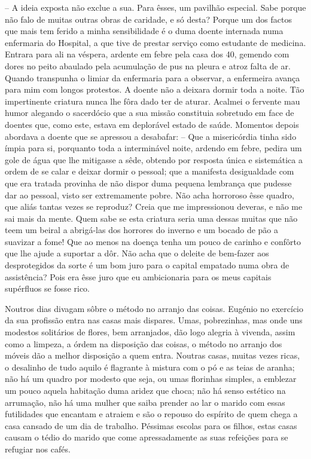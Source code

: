 \documentclass[9pt]{article}
\begin{document}
-- A ideia exposta não exclue a sua. Para êsses, um pavi\-lhão especial.
Sabe porque não falo de muitas outras obras de caridade, e só desta? Porque um dos factos que mais tem ferido a minha sensibilidade é o duma doente internada numa enfermaria do Hospital, a que tive de prestar serviço
como estudante de medicina. Entrara para ali na véspera, ardente em febre pela
casa dos 40, gemendo com dores no peito abaulado pela acumula\-ção de
pus na pleura e atroz falta de ar. Quando transpunha o limiar da enfermaria para a observar, a enfermeira avan\-ça para mim com longos protestos. A
doente não a deixara dormir toda a noite. Tão impertinente criatura nunca
\-lhe fôra dado ter de aturar. Acalmei o fervente mau humor alegando o sacerdócio que a sua missão constituia sobretudo em face de doentes que, como
este, estava em deplorável estado de saúde. Momentos depois abordava a doente que  se apressou a desabafar: -- Que a misericórdia tinha sido ímpia para
si, porquanto toda a interminável noite, ardendo em febre, pedira um gole de
água que lhe mitigasse a sêde, obtendo por resposta única e sistemática a
ordem de se calar e deixar dormir o pessoal; que a manifesta desigualdade
com que era tratada provinha de não dispor duma pequena lembran\-ça que pudesse dar ao pessoal, visto ser extremamente pobre. Não acha horroroso êsse quadro, que aliás tantas vezes se reproduz? Creia que me impressionou
deveras, e não me sai mais da mente. Quem sabe se esta criatura seria uma
dessas muitas que não teem um beiral a abrigá-las dos horrores do inverno
e um bocado de pão a suavizar a fome! Que ao menos na doença tenha um pouco de carinho e con\-fôr\-to que lhe ajude a suportar a dôr. Não acha que o
deleite de bem-fazer aos desprotegidos da sorte é um bom juro para o capital empatado numa obra de assistência? Pois era êsse juro que eu ambicionaria para os meus capitais supérfluos se fosse rico.


Noutros dias divagam sôbre o método no arranjo das coisas. Eugé\-nio no exercício da sua profissão entra nas casas mais dispares. Umas,
pobrezinhas, mas onde uns modestos solitários de flores, bem arranjados,
dão logo alegria à vivenda, assim como a limpeza, a órdem na disposi\-ção
das coisas, o método no arranjo dos móveis dão a me\-lhor disposi\-ção a
quem entra. Noutras casas, muitas vezes ricas, o desalinho de tudo aquilo é flagrante à mistura com o pó e as teias de aranha; não há um
quadro por modesto que seja, ou umas florinhas simples, a emblezar um
pouco aquela habita\-ção duma aridez que choca; não há senso estético
na arruma\-ção, não há uma mu\-lher que saiba prender ao lar o marido
com essas futilidades que encantam e atraiem e são o repouso do espírito de quem chega a casa cansado de um dia de traba\-lho. Péssimas
escolas para os fi\-lhos, estas casas causam o tédio do marido que come
apressadamente as suas refei\-ções para se refugiar nos cafés.
\end{document}

